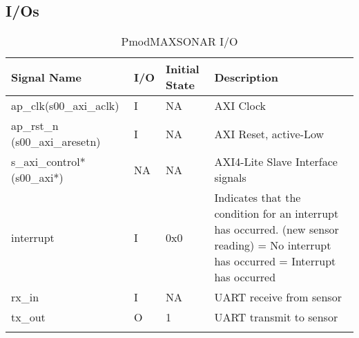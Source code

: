 \subsection{I/Os}
\begin{longtable}{|p{4cm}|p{1cm}|p{2cm}|p{6.6cm}|}
\hline
\textbf{Signal Name} & \textbf{I/O} & \textbf{Initial State} & \textbf{Description} \\
\hline
ap\_clk(s00\_axi\_aclk) & I & NA & AXI Clock \\
\hline
ap\_rst\_n (s00\_axi\_aresetn) & I & NA & AXI Reset, active-Low \\
\hline
s\_axi\_control* (s00\_axi*) & NA & NA & AXI4-Lite Slave Interface signals \\
\hline
interrupt & I & 0x0 & Indicates that the condition for an interrupt has occurred. (new sensor reading)
\newline 0 = No interrupt has occurred
\newline 1 = Interrupt has occurred \\
\hline
rx\_in & I & NA & UART receive from sensor \\
\hline
tx\_out & O & 1 & UART transmit to sensor \\
\hline
\caption{PmodMAXSONAR I/O}
\end{longtable}

